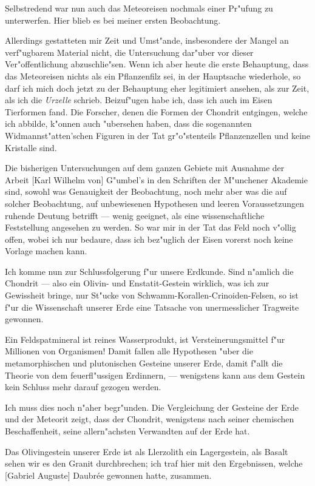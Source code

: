 \documentclass[a4paper, 11pt, oneside]{article}
\begin{document}
Selbstredend war nun auch das Meteoreisen nochmals einer Pr"ufung zu unterwerfen. Hier blieb es bei meiner ersten Beobachtung.

Allerdings gestatteten mir Zeit und Umst"ande, insbesondere der Mangel an verf"ugbarem Material nicht, die Untersuchung dar"uber vor dieser Ver"offentlichung abzuschlie"sen. Wenn ich aber heute die erste Behauptung, dass das Meteoreisen nichts als ein Pflanzenfilz sei, in der Hauptsache wiederhole, so darf ich mich doch jetzt zu der Behauptung eher legitimiert ansehen, als zur Zeit, als ich die \emph{Urzelle} schrieb. Beizuf"ugen habe ich, dass ich auch im Eisen Tierformen fand. Die Forscher, denen die Formen der Chondrit entgingen, welche ich abbilde, k"onnen auch "ubersehen haben, dass die sogenannten Widmannst"atten'schen Figuren in der Tat gr"o"stenteils Pflanzenzellen und keine Kristalle sind.

Die bisherigen Untersuchungen auf dem ganzen Gebiete mit Ausnahme der Arbeit [Karl Wilhelm von] G"umbel's in den Schriften der M"unchener Akademie sind, sowohl was Genauigkeit der Beobachtung, noch mehr aber was die auf solcher Beobachtung, auf unbewiesenen Hypothesen und leeren Voraussetzungen ruhende Deutung betrifft --- wenig geeignet, als eine wissenschaftliche Feststellung angesehen zu werden. So war mir in der Tat das Feld noch v"ollig offen, wobei ich nur bedaure, dass ich bez"uglich der Eisen vorerst noch keine Vorlage machen kann.

Ich komme nun zur Schlussfolgerung f"ur unsere Erdkunde. Sind n"amlich die Chondrit --- also ein Olivin- und Enstatit-Gestein wirklich, was ich zur Gewissheit bringe, nur St"ucke von Schwamm-Korallen-Crinoiden-Felsen, so ist f"ur die Wissenschaft unserer Erde eine Tatsache von unermesslicher Tragweite gewonnen.

Ein Feldspatmineral ist reines Wasserprodukt, ist Versteinerungsmittel f"ur Millionen von Organismen! Damit fallen alle Hypothesen "uber die metamorphischen und plutonischen Gesteine unserer Erde, damit f"allt die Theorie von dem feuerfl"ussigen Erdinnern, --- wenigstens kann aus dem Gestein kein Schluss mehr darauf gezogen werden.

Ich muss dies noch n"aher begr"unden. Die Vergleichung der Gesteine der Erde und der Meteorit zeigt, dass der Chondrit, wenigstens nach seiner chemischen Beschaffenheit, seine allern"achsten Verwandten auf der Erde hat.

Das Olivingestein unserer Erde ist als Llerzolith ein Lagergestein, als Basalt sehen wir es den Granit durchbrechen; ich traf hier mit den Ergebnissen, welche [Gabriel Auguste] Daubrée gewonnen hatte, zusammen.
\end{document}
